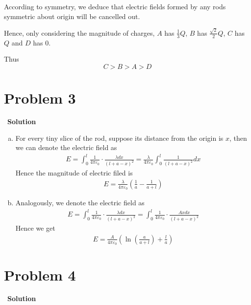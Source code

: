 \documentclass[12pt,a4paper]{article}
\begin{document}
According to symmetry, we deduce that electric fields formed by any rods symmetric about origin will be cancelled out.

Hence, only considering the magnitude of charges, $A$ has $\frac{1}{3}Q$, $B$ has $\frac{\sqrt{2}}{2}Q$, $C$ has $Q$ and $D$ has 0.

Thus
\begin{equation*}
    C > B > A > D
\end{equation*}

\section*{\large \textbf{Problem 3}}~{\textbf{Solution}}

\begin{enumerate}[(a)]
    \item For every tiny slice of the rod, suppose its distance from the origin is $x$, then we can denote the electric field as
    \begin{align}
        E = \int_0^l \frac{1}{4\pi\varepsilon_0} \cdot \frac{\lambda dx}{(l+a-x)^2} = \frac{\lambda}{4\pi\varepsilon_0} \int_0^l \frac{1}{(l+a-x)^2} dx
    \end{align}
    Hence the magnitude of electric filed is
    \begin{align}
        E = \frac{\lambda}{4\pi\varepsilon_0} \left( \frac{1}{a} - \frac{1}{a+l} \right)
    \end{align}
    
    \item Analogously, we denote the electric field as
    \begin{align}
        E = \int_0^l \frac{1}{4\pi\varepsilon_0} \cdot \frac{\lambda dx}{(l+a-x)^2} = \int_0^l \frac{1}{4\pi\varepsilon_0} \cdot \frac{Ax dx}{(l+a-x)^2}
    \end{align}
    Hence we get
    \begin{align}
        E = \frac{A}{4\pi\varepsilon_0} \left( \ln \left( \frac{a}{a+l} \right) + \frac{l}{a} \right)
    \end{align}
\end{enumerate}

\section*{\large \textbf{Problem 4}}~{\textbf{Solution}}
\end{document}

